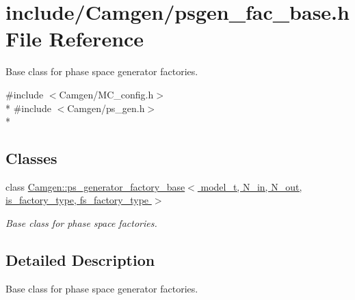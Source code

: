\hypertarget{a00748}{}\section{include/\+Camgen/psgen\+\_\+fac\+\_\+base.h File Reference}
\label{a00748}


Base class for phase space generator factories.  


{\ttfamily \#include $<$Camgen/\+M\+C\+\_\+config.\+h$>$}\\*
{\ttfamily \#include $<$Camgen/ps\+\_\+gen.\+h$>$}\\*
\subsection*{Classes}
\begin{DoxyCompactItemize}
\item 
class \hyperlink{a00453}{Camgen\+::ps\+\_\+generator\+\_\+factory\+\_\+base$<$ model\+\_\+t, N\+\_\+in, N\+\_\+out, is\+\_\+factory\+\_\+type, fs\+\_\+factory\+\_\+type $>$}
\begin{DoxyCompactList}\small\item\em Base class for phase space factories. \end{DoxyCompactList}\end{DoxyCompactItemize}


\subsection{Detailed Description}
Base class for phase space generator factories. 

